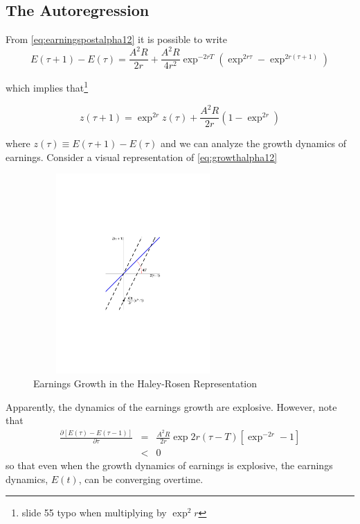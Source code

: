 \subsection{The Autoregression}
From \eqref{eq:earningspostalpha12} it is possible to write
\begin{equation}
E(\tau + 1) - E(\tau) =  \frac{A^2 R}{2r}+ \frac{A^2 R}{4r^2} \exp^{-2rT} \left( \exp^{2r\tau} - \exp^{2r(\tau+1)} \right) 
\end{equation}

\noindent which implies that\footnote{slide 55 typo when multiplying by $\exp^2r$}

\begin{equation}
z(\tau + 1) = \exp^{2r} z(\tau) + \frac{A^2 R}{2r} \left( 1 - \exp^{2r} \right) \label{eq:growthalpha12}
\end{equation}

\noindent where $z(\tau) \equiv E(\tau + 1) - E(\tau)$ and we can analyze the growth dynamics of earnings. Consider a visual representation of \eqref{eq:growthalpha12}

\begin{center}
\begin{figure}[H]
\caption{Earnings Growth in the Haley-Rosen Representation}
\centering
\includegraphics[width=3in, height=3in]{Figures/fig-explode-converge.pdf}
\end{figure}
\end{center}

\indent Apparently, the dynamics of the earnings growth are explosive. However, note that
\begin{eqnarray}
\frac{\partial \left[ E(\tau) - E(\tau - 1) \right] }{\partial \tau} &=& \frac{A^2 R}{2r} \exp{2r(\tau - T)} \left[ \exp^{-2r} - 1 \right] \nonumber \\
&<& 0
\end{eqnarray}
so that even when the growth dynamics of earnings is explosive, the earnings dynamics, $E(t)$, can be converging overtime.

